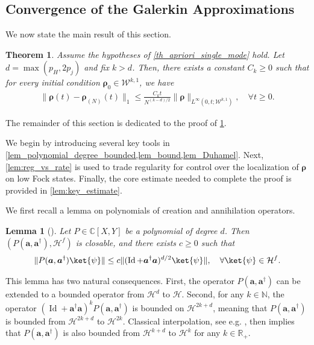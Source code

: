 \documentclass{article}
\newtheorem{theorem}{Theorem}
\newtheorem{lemma}{Lemma}
\newcommand{\C}{\mathbb{C}}
\newcommand{\R}{\mathbb{R}}
\newcommand{\xH}{\mathcal{H}}
\newcommand{\xN}{\mathbb{N}}
\newcommand{\xW}{\mathcal{W}}
\newcommand{\rN}{{\boldsymbol{\rho}_{(N)}}}
\let\bf\boldsymbol
\newcommand{\Id}{\operatorname{Id}}
\newcommand{\orho}{{\bf \rho}}
\newcommand{\oa}{{\bf a}}
\begin{document}
\subsection{Convergence of the Galerkin Approximations}
\label{subsec_cvg_1mode}

We now state the main result of this section.

\begin{theorem}
\label{th_main_1_mode}
Assume the hypotheses of \cref{th_apriori_single_mode} hold. Let $d = \max(p_H, 2p_j)$ and fix $k > d$. Then, there exists a constant $C_k \geq 0$ such that for every initial condition $\orho_0 \in \xW^{k,1}$, we have
\begin{align}
    \label{eq_th_main_1_mode}
    \|\orho(t)-\rN(t)\|_1 \leq \frac{C_k t }{N^{(k-d)/2}} \| \orho\|_{L^\infty(0,t; \xW^{k,1})}, \quad \forall t \geq 0.
\end{align}
\end{theorem}

The remainder of this section is dedicated to the proof of \cref{th_main_1_mode}.

We begin by introducing several key tools in \cref{lem_polynomial_degree_bounded,lem_bound,lem_Duhamel}. Next, \cref{lem:reg_vs_rate} is used to trade regularity for control over the localization of $\orho$ on low Fock states. Finally, the core estimate needed to complete the proof is provided in \cref{lem:key_estimate}.

We first recall a lemma on polynomials of creation and annihilation operators.

\begin{lemma}[{\cite[Lemma B.1]{gondolfEnergyPreservingEvolutions2024}}]
\label{lem_polynomial_degree_bounded}
Let $P \in \C[X,Y]$ be a polynomial of degree $d$. Then $(P(\oa,\oa^\dag), \xH^f)$ is closable, and there exists $c \geq 0$ such that
\begin{align}
    \|P(\oa,\oa^\dag) \ket{\psi}\| \leq c \|(\Id + \oa^\dag \oa)^{d/2} \ket{\psi}\|, \quad \forall \ket{\psi} \in \xH^f.
\end{align}
\end{lemma}

This lemma has two natural consequences. First, the operator $P(\oa,\oa^\dag)$ can be extended to a bounded operator from $\xH^d$ to $\xH$. Second, for any $k \in \xN$, the operator $(\Id + \oa^\dag \oa)^k P(\oa,\oa^\dag)$ is bounded on $\xH^{2k+d}$, meaning that $P(\oa,\oa^\dag)$ is bounded from $\xH^{2k+d}$ to $\xH^{2k}$. Classical interpolation, see e.g. \cite[Chap. 4]{berghInterpolationSpacesIntroduction1976}, then implies that $P(\oa,\oa^\dag)$ is also bounded from $\xH^{k+d}$ to $\xH^k$ for any $k \in \R_+$.
\end{document}
